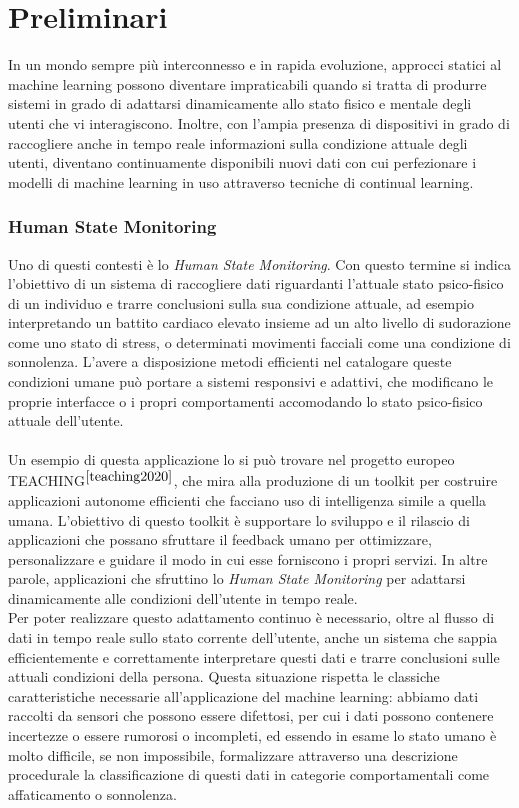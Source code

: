 \chapter{Preliminari}
In un mondo sempre più interconnesso e in rapida evoluzione, approcci statici al machine learning possono diventare impraticabili quando si tratta di produrre sistemi in grado di adattarsi dinamicamente allo stato fisico e mentale degli utenti che vi interagiscono. Inoltre, con l'ampia presenza di dispositivi in grado di raccogliere anche in tempo reale informazioni sulla condizione attuale degli utenti, diventano continuamente disponibili nuovi dati con cui perfezionare i modelli di machine learning in uso attraverso tecniche di continual learning.

\subsection*{Human State Monitoring}
Uno di questi contesti è lo \textit{Human State Monitoring}. Con questo termine si indica l'obiettivo di un sistema di raccogliere dati riguardanti l'attuale stato psico-fisico di un individuo e trarre conclusioni sulla sua condizione attuale, ad esempio interpretando un battito cardiaco elevato insieme ad un alto livello di sudorazione come uno stato di stress, o determinati movimenti facciali come una condizione di sonnolenza. L'avere a disposizione metodi efficienti nel catalogare queste condizioni umane può portare a sistemi responsivi e adattivi, che modificano le proprie interfacce o i propri comportamenti accomodando lo stato psico-fisico attuale dell'utente.\\\\
Un esempio di questa applicazione lo si può trovare nel progetto europeo\\TEACHING$^{\cite{teaching2020}}$, che mira alla produzione di un toolkit per costruire applicazioni autonome efficienti che facciano uso di intelligenza simile a quella umana. L'obiettivo di questo toolkit è supportare lo sviluppo e il rilascio di applicazioni che possano sfruttare il feedback umano per ottimizzare, personalizzare e guidare il modo in cui esse forniscono i propri servizi. In altre parole, applicazioni che sfruttino lo \textit{Human State Monitoring} per adattarsi dinamicamente alle condizioni dell'utente in tempo reale.\\
Per poter realizzare questo adattamento continuo è necessario, oltre al flusso di dati in tempo reale sullo stato corrente dell'utente, anche un sistema che sappia efficientemente e correttamente interpretare questi dati e trarre conclusioni sulle attuali condizioni della persona. Questa situazione rispetta le classiche caratteristiche necessarie all'applicazione del machine learning: abbiamo dati raccolti da sensori che possono essere difettosi, per cui i dati possono contenere incertezze o essere rumorosi o incompleti, ed essendo in esame lo stato umano è molto difficile, se non impossibile, formalizzare attraverso una descrizione procedurale la classificazione di questi dati in categorie comportamentali come affaticamento o sonnolenza.


